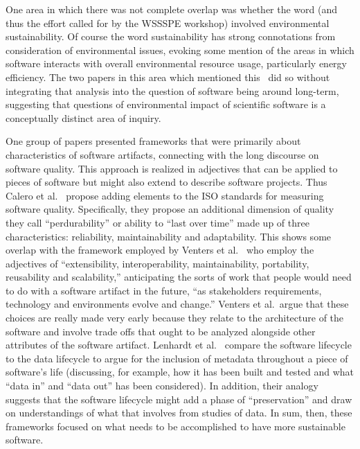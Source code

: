 \documentclass[11pt, oneside]{amsart}
\begin{document}
One area in which there was not complete overlap was whether the word
(and thus the effort called for by the WSSSPE workshop) involved
environmental sustainability. Of course the word sustainability has
strong connotations from consideration of environmental issues,
evoking some mention of the areas in which software interacts with
overall environmental resource usage, particularly energy efficiency.
The two papers in this area which mentioned this~\cite{Venters_WSSSPE,Calero_WSSSPE} did so without
integrating that analysis into the question of software being around
long-term, suggesting that questions of environmental impact of
scientific software is a conceptually distinct area of inquiry.

One group of papers presented frameworks that were primarily about
characteristics of software artifacts, connecting with the long
discourse on software quality. This approach is realized in adjectives
that can be applied to pieces of software but might also extend to
describe software projects.  Thus Calero et al.~\cite{Calero_WSSSPE} propose adding elements to the ISO
standards for measuring software quality. Specifically, they propose an additional
dimension of quality they call ``perdurability'' or ability to ``last over
time'' made up of three characteristics: reliability, maintainability
and adaptability. This shows some overlap with the framework employed
by Venters et al.~\cite{Venters_WSSSPE} who employ the adjectives of
``extensibility, interoperability, maintainability, portability,
reusability and scalability,'' anticipating the sorts of work that
people would need to do with a software artifact in the future, ``as
stakeholders requirements, technology and environments evolve and
change.'' Venters et al.~argue that these choices are really made very
early because they relate to the architecture of the software and
involve trade offs that ought to be analyzed alongside other
attributes of the software artifact. Lenhardt et
al.~\cite{Lenhardt_WSSSPE} compare the software lifecycle to the data
lifecycle to argue for the inclusion of metadata throughout a piece of
software's life (discussing, for example, how it has been built and
tested and what ``data in'' and ``data out'' has been considered). In
addition, their analogy suggests that the software lifecycle might add
a phase of ``preservation'' and draw on understandings of what that
involves from studies of data.  In sum, then, these frameworks focused
on what needs to be accomplished to have more sustainable software.
\end{document}
